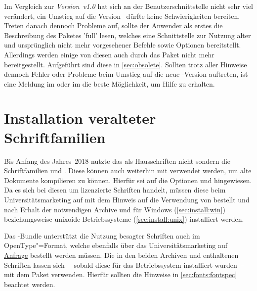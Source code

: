 Im Vergleich zur \emph{Version~v1.0} hat sich an der Benutzerschnittstelle 
nicht sehr viel verändert, ein Umstieg auf die Version~\vTUDScript{} dürfte 
keine Schwierigkeiten bereiten. Treten danach dennoch Probleme auf, sollte der 
Anwender als erstes die Beschreibung des Paketes 'full' 
lesen, welches eine Schnittstelle zur Nutzung alter und ursprünglich nicht mehr 
vorgesehener Befehle sowie Optionen bereitstellt. Allerdings werden einige von 
diesen auch durch das Paket  nicht mehr bereitgestellt. 
Aufgeführt sind diese in \autoref{sec:obsolete}. Sollten trotz aller Hinweise 
dennoch Fehler oder Probleme beim Umstieg auf die neue \TUDScript-Version 
auftreten, ist eine Meldung im \Forum oder im \GitHubRepo[issues] die beste 
Möglichkeit, um Hilfe zu erhalten.



\section{Installation veralteter Schriftfamilien}
%
%

Bis Anfang des Jahres~2018 nutzte das \TUDCD als Hausschriften nicht \OpenSans 
sondern die Schriftfamilien \Univers und \DIN. Diese können auch weiterhin mit 
\TUDScript verwendet werden, um alte Dokumente kompilieren zu können. Hierfür 
sei auf die Optionen  und  
hingewiesen. Da es sich bei diesen um lizenzierte Schriften handelt, müssen 
diese beim Universitätsmarketing auf 
 mit 
dem Hinweis auf die Verwendung von  bestellt und nach Erhalt der 
notwendigen Archive  und  für 
Windows (\autoref{sec:install:win}) beziehungsweise unixoide Betriebssysteme 
(\autoref{sec:install:unix}) installiert werden. 

Das \TUDScript-Bundle unterstützt die Nutzung besagter Schriften auch im 
OpenType"=Format, welche ebenfalls über das Universitätsmarketing auf 
\href{https://tu-dresden.de/cd/1_basiselemente/03_hausschrift/}{Anfrage}
bestellt werden müssen. Die in den beiden Archiven  
und  enthaltenen Schriften lassen sich~-- sobald diese für 
das Betriebssystem installiert wurden~-- mit dem Paket  
verwenden. Hierfür sollten die Hinweise in \autoref{sec:fonts:fontspec} 
beachtet werden.

